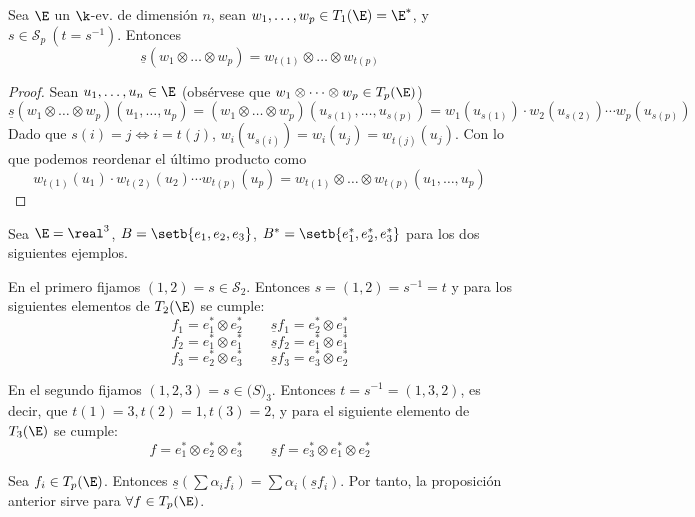 \begin{prop}
    Sea $ \E $ un $ \k $-ev.  de dimensión $ n $, sean $ w_1, \dots, w_p
    \in T_1(\E) = \E^\ast $, y $ s \in \mathcal{S}_p \ (t = s^{-1}) $.
    Entonces
    \[
        \underline{s}(w_1 \otimes \dots \otimes w_p) = w_{t(1)} \otimes
        \dots \otimes w_{t(p)}
    \]
\end{prop}
\begin{proof}
    Sean $ u_1, \dots, u_n \in \E $ (obsérvese que $ w_1 \otimes \dots
    \otimes w_p \in T_p(\E) $)
    \[
        \underline{s}(w_1 \otimes \dots \otimes w_p)(u_1,\dots, u_p) = (w_1
        \otimes \dots \otimes w_p)(u_{s(1)}, \dots, u_{s(p)}) = w_1(u_{s
        (1)}) \cdot w_2(u_{s(2)}) \cdots w_p(u_{s(p)})
    \]
    Dado que $ s(i) = j \iff i = t(j) $, $ w_i(u_{s(i)}) = w_i(u_j) = w_
    {t(j)}(u_j) $.  Con lo que podemos reordenar el último producto
    como
    \[
        w_{t(1)}(u_1) \cdot w_{t(2)}(u_2) \cdots w_{t(p)}(u_p) =w_{t(1)}
        \otimes \dots \otimes w_{t(p)}(u_1,\dots, u_p)
    \]
\end{proof}
\begin{example}
    \label{exemple_1.6.2} Sea $ \E=\real^3 $, $ B = \setb{e_1,e_2,e_3} $,
    $ B^\ast = \setb{e_1^\ast, e_2^\ast, e_3^\ast} $ para los dos
    siguientes ejemplos.

    En el primero fijamos $ (1,2) = s \in \mathcal{S}_2 $.  Entonces $ s
    = (1,2) = s^{-1}=t $ y para los siguientes elementos de $ T_2(\E) $
    se cumple:
    \[
        f_1=e_1^\ast \otimes e_2^\ast \qquad \underline{s} f_1 = e_2^\ast
        \otimes e_1^\ast
    \]
    \[
        f_2=e_1^\ast \otimes e_1^\ast \qquad \underline{s} f_2 = e_1^\ast
        \otimes e_1^\ast
    \]
    \[
        f_3=e_2^\ast \otimes e_3^\ast \qquad \underline{s} f_3 = e_3^\ast
        \otimes e_2^\ast
    \]

    En el segundo fijamos $ (1,2,3) = s \in \mathcal(S)_3 $.  Entonces $
    t = s^{-1} = (1, 3, 2) $, es decir, que $ t(1) = 3, t(2) = 1, t(3) =
    2 $, y para el siguiente elemento de $ T_3(\E) $ se cumple:
    \[
        f = e_1^\ast \otimes e_2^\ast \otimes e_3^\ast \qquad \underline
        {s} f = e_3^\ast \otimes e_1^\ast \otimes e_2^\ast
    \]
\end{example}
\begin{obs}
    \label{obs_1.6.1} Sea $ f_i \in T_p(\E) $.  Entonces $ \underline{s}
    (\sum \alpha_i f_i) = \sum \alpha_i (\underline{s} f_i) $. Por
    tanto, la proposición anterior sirve para $ \forall f \in T_p(\E) $.
\end{obs}
